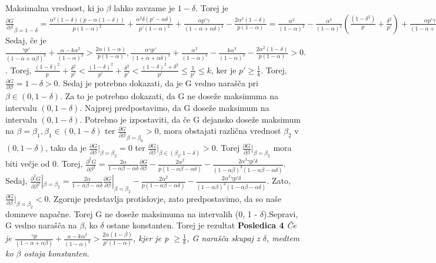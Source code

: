 \documentclass[12pt]{article}
\begin{document}
Maksimalna vrednost, ki jo $\beta$ lahko zavzame je $1- \delta$. Torej je $\frac{\partial G}{\partial \beta}_{\beta=1-\delta} = \frac{\alpha^2(1- \delta)(p - \alpha(1-\delta))}{p(1-\alpha)^2} + \frac{\alpha^2\delta(p' - \alpha\delta)}{p'(1 - \alpha)^2} + \frac{\alpha p' \gamma}{(1 - \alpha + \alpha\delta)^2} - \frac{2\alpha^2(1-\delta)}{p(1 - \alpha)} = \frac{\alpha^2}{(1-\alpha)^2} - \frac{\alpha^3}{(1 - \alpha)^2}(\frac{(1 - \delta^2)}{p} + \frac{\delta^2}{p'}) + \frac{\alpha p' \gamma}{(1 - \alpha + \alpha\delta)^2} - \frac{2\alpha^2(1 - \delta)}{p(1 - \alpha)}.$ Sedaj, če je $\frac{\gamma p'}{(1 - \alpha + \alpha\beta)^2} + \frac{\alpha - k \alpha^2}{(1 - \alpha)^2} > \frac{2\alpha(1 - \alpha)}{p(1 - \alpha)}, \frac{\alpha\gamma p'}{(1 + \alpha + \alpha\delta)^2} + \frac{\alpha^2}{(1- \alpha)^2} - \frac{k\alpha^3}{(1 - \alpha)^2} - \frac{2\alpha^2(1 - \delta)}{p(1 - \alpha)} > 0.$. Torej, $\frac{(1 - \delta)^2}{p} + \frac{\delta^2}{p'} < \frac{(1 - \delta)^2}{p'} + \frac{\delta^2}{p'} < \frac{(1 - \delta)^2 + \delta^2}{p'} \leq \frac{1}{p'} \leq k$, ker je $p' \geq \frac{1}{k}$.
\newline
Torej, $\frac{\partial G}{\partial \beta} = 1- \delta > 0.$
Sedaj je potrebno dokazati, da je G vedno narašča pri $\beta \in (0, 1- \delta)$. Za to je potrebno dokazati, da G ne doseže maksimuma na intervalu $(0, 1- \delta)$. Najprej predpostavimo, da G doseže maksimum na intervalu $(0, 1- \delta)$. Potrebno je izpostaviti, da če G dejansko doseže maksimum na $\beta = \beta_1, \beta_1 \in (0, 1- \delta)$ ter $\frac{\partial G}{\partial \beta}_{\beta=\beta_0} > 0$, mora obstajati različna vrednost $\beta_2$ v $(0, 1 - \delta)$, tako da je $\frac{\partial G}{\partial \beta}|_{\beta=\beta_2} = 0$ ter $\frac{\partial G}{\partial \beta}|_{\beta\in(\beta_2, 1 - \delta)} > 0$. Torej $\frac{\partial G}{\partial \beta}|_{\beta=\beta_2}$ mora biti večje od 0.
\newline
\newline
Torej, $\frac{\partial^2 G}{\partial \beta^2} = \frac{2\alpha}{1 - \alpha\beta - \alpha\delta} \frac{\partial G}{\partial \beta} - \frac{2 \alpha^2}{p(1 - \alpha\beta - \alpha\delta)} - \frac{2\alpha^3\gamma p' \delta}{(1-\alpha\beta)^3(1 - \alpha\beta - \alpha\delta)}$.
\newline
\newline
Sedaj, $\frac{\partial^2 G}{\partial \beta^2}|_{\beta=\beta_2} = \frac{2\alpha}{1 - \alpha\beta - \alpha\delta} \frac{\partial G}{\partial \beta}|_{\beta=\beta_2} - \frac{2\alpha^2}{p(1 - \alpha\beta - \alpha\delta)} - \frac{2\alpha^3\gamma p' \delta}{(1 - \alpha\beta)^3(1 - \alpha\beta-\alpha\delta)}$. Zato, $\frac{\partial G}{\partial\beta}|_{\beta=\beta_2} < 0$. Zgornje predstavlja protislovje, zato predpostavimo, da so naše domneve napačne. Torej G ne doseže maksimuma na intervalih (0, 1 - $\delta$).Sepravi, G vedno narašča na $\beta$, ko $\delta$ ostane konstanten. Torej je rezultat
\newline
\newline
\textbf{Posledica 4} \textit{Če je $\frac{\gamma p}{(1 - \alpha + \alpha\beta)} + \frac{\alpha - k\alpha^2}{(1 - \alpha)^2} > \frac{2\alpha(1 - \beta)}{p' (1 - \alpha)}$, kjer je p $\geq \frac{1}{k}$, G narašča skupaj z $\delta$, medtem ko $\beta$ ostaja konstanten.}
\end{document}
